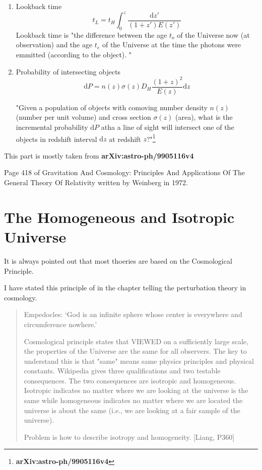 \begin{enumerate}
\item
Lookback time
\begin{equation}
	t_L = t_H \int_0^z \frac{\mathrm dz'}{(1+z')E(z')}
\end{equation}
Lookback time is "the difference between the age $t_o$ of the Universe now (at observation) and the age $t_e$ of the Universe at the time the photons were emmitted (according to the object). "

\item
Probability of intersecting objects
\begin{equation}
	\mathrm dP = n(z)\sigma(z)D_H\frac{(1+z)^2}{E(z)}\mathrm dz
\end{equation}

"Given a population of objects with comoving number density $n(z)$ (number per unit volume) and cross section $\sigma(z)$ (area), what is the incremental probability $\mathrm dP$ atha a line of sight will intersect one of the objects in redshift interval $\mathrm dz$ at redshift $z$?"\footnote{{\bf arXiv:astro-ph/9905116v4}}


\end{enumerate}

This part is mostly taken from {\bf arXiv:astro-ph/9905116v4}

Page 418 of Gravitation And Cosmology: Principles And Applications Of The General Theory Of Relativity written by Weinberg in 1972.



















\section{The Homogeneous and Isotropic Universe}

It is always pointed out that most thoeries are based on the Cosmological Principle.

I have stated this principle of in the chapter telling the perturbation theory in cosmology.

\begin{quotation}
Empedocles: `God is an infinite sphere whose center is everywhere and circumference nowhere.'

Cosmological principle states that VIEWED on a sufficiently large scale, the properties of the Universe are the same for all observers. The key to understand this is that "same" means same physics principles and physical constants. 
Wikipedia gives three qualifications and two testable consequences. The two consequences are isotropic and homogeneous. Isotropic indicates no matter where we are looking at the universe is the same while homogeneous indicates no matter where we are located the universe is about the same (i.e., we are looking at a fair sample of the universe).

Problem is how to describe isotropy and homogeneity. [Liang, P360]
\end{quotation}

